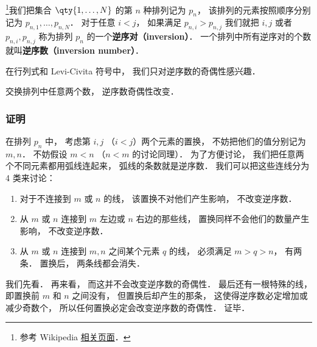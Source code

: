 
\begin{issues}
\issueDraft
\end{issues}


\footnote{参考 Wikipedia \href{https://en.wikipedia.org/wiki/Inversion_(discrete_mathematics)}{相关页面}．}我们把集合 $\qty{1,\dots,N}$ 的第 $n$ 种排列记为 $p_n$， 该排列的元素按照顺序分别记为 $p_{n,1}, \dots, p_{n,N}$． 对于任意 $i < j$， 如果满足 $p_{n,i} > p_{n,j}$ 我们就把 $i, j$ 或者 $p_{n,i}, p_{n,j}$ 称为排列 $p_n$ 的一个\textbf{逆序对（inversion）}． 一个排列中所有逆序对的个数就叫\textbf{逆序数（inversion number）}．

在行列式和 Levi-Civita 符号中， 我们只对逆序数的奇偶性感兴趣． 

\begin{theorem}{}
交换排列中任意两个数， 逆序数奇偶性改变． 
\end{theorem}

\subsubsection{证明}
在排列 $p_n$ 中， 考虑第 $i, j$ （$i < j$）两个元素的置换， 不妨把他们的值分别记为 $m, n$． 不妨假设 $m < n$ （$n < m$ 的讨论同理）． 为了方便讨论， 我们把任意两个不同元素都用弧线连起来， 弧线的条数就是逆序数． 我们可以把这些连线分为 4 类来讨论：
\begin{enumerate}
\item 对于不连接到 $m$ 或 $n$ 的线， 该置换不对他们产生影响， 不改变逆序数．
\item 从 $m$ 或 $n$ 连接到 $m$ 左边或 $n$ 右边的那些线， 置换同样不会他们的数量产生影响， 不改变逆序数．
\item 从 $m$ 或 $n$ 连接到 $m, n$ 之间某个元素 $q$ 的线， 必须满足 $m > q > n$， 有两条． 置换后， 两条线都会消失．
\end{enumerate}

我们先看． 再来看， 而这并不会改变逆序数的奇偶性． 最后还有一根特殊的线， 即置换前 $m$ 和 $n$ 之间没有， 但置换后却产生的那条， 这使得逆序数必定增加或减少奇数个， 所以任何置换必定会改变逆序数的奇偶性． 证毕．
